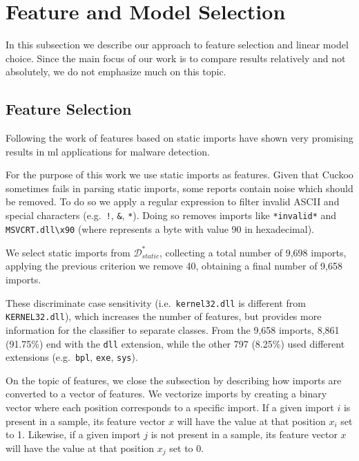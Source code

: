 {\color{red}

\section{Feature and Model Selection}\label{sec:feature_model}

In this subsection we describe our approach to feature selection and linear model choice. Since the main focus of our work is to compare results relatively and not absolutely, we do not emphasize much on this topic.

\subsection{Feature Selection}

Following the work of \cite{miller:rev_int,schultz:data_mining} features based on static imports have shown very promising results in \gls{ml} applications for malware detection.

For the purpose of this work we use static imports as features. Given that Cuckoo sometimes fails in parsing static imports, some reports contain noise which should be removed. To do so we apply a regular expression to filter invalid ASCII and special characters (e.g.\ \texttt{!}, \texttt{\&}, \texttt{*}). Doing so removes imports like \texttt{*invalid*} and \texttt{MSVCRT.dll\textbackslash x90} (where  represents a byte with value 90 in hexadecimal).

We select static imports from $\mathcal{D}_{static}^*$, collecting a total number of 9,698 imports, applying the previous criterion we remove 40, obtaining a final number of 9,658 imports.

These discriminate case sensitivity (i.e.\ \texttt{kernel32.dll} is different from \texttt{KERNEL32.dll}), which increases the number of features, but provides more information for the classifier to separate classes. From the 9,658 imports, 8,861 (91.75\%) end with the \texttt{dll} extension, while the other 797 (8.25\%) used different extensions (e.g.\ \texttt{bpl}, \texttt{exe}, \texttt{sys}).

On the topic of features, we close the subsection by describing how imports are converted to a vector of features. We vectorize imports by creating a binary vector where each position corresponds to a specific import. If a given import $i$ is present in a sample, its feature vector $x$ will have the value at that position $x_i$ set to 1. Likewise, if a given import $j$ is not present in a sample, its feature vector $x$ will have the value at that position $x_j$ set to 0.

}
